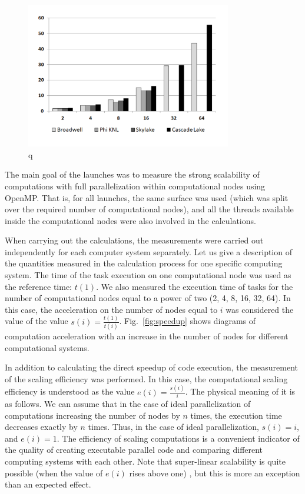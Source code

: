 \begin{figure}[ht]
\centering
\includegraphics[width=0.8\textwidth]{pics/text_2_scaling/speedup.pdf}
\caption{q}\label{fig:pic_classical_methods_multilayer}
\end{figure}

The main goal of the launches was to measure the strong scalability of computations with full parallelization within computational nodes using OpenMP.
That is, for all launches, the same surface was used (which was split over the required number of computational nodes), and all the threads available inside the computational nodes were also involved in the calculations.

When carrying out the calculations, the measurements were carried out independently for each computer system separately.
Let us give a description of the quantities measured in the calculation process for one specific computing system.
The time of the task execution on one computational node was used as the reference time: $ t(1) $.
We also measured the execution time of tasks for the number of computational nodes equal to a power of two (2, 4, 8, 16, 32, 64).
In this case, the acceleration on the number of nodes equal to $ i $ was considered the value of the value $ s(i) = \frac{t(1)}{t(i)} $.
Fig.~\ref{fig:speedup} shows diagrams of computation acceleration with an increase in the number of nodes for different computational systems.

In addition to calculating the direct speedup of code execution, the measurement of the scaling efficiency was performed.
In this case, the computational scaling efficiency is understood as the value $ e(i) = \frac{s(i)}{i} $.
The physical meaning of it is as follows.
We can assume that in the case of ideal parallelization of computations increasing the number of nodes by $ n $ times, the execution time decreases exactly by $ n $ times.
Thus, in the case of ideal parallelization, $ s (i) = i $, and $ e(i) = 1 $.
The efficiency of scaling computations is a convenient indicator of the quality of creating executable parallel code and comparing different computing systems with each other.
Note that super-linear scalability is quite possible (when the value of $ e(i) $ rises above one) \cite{Benderskiy_Scaling}, but this is more an exception than an expected effect.

